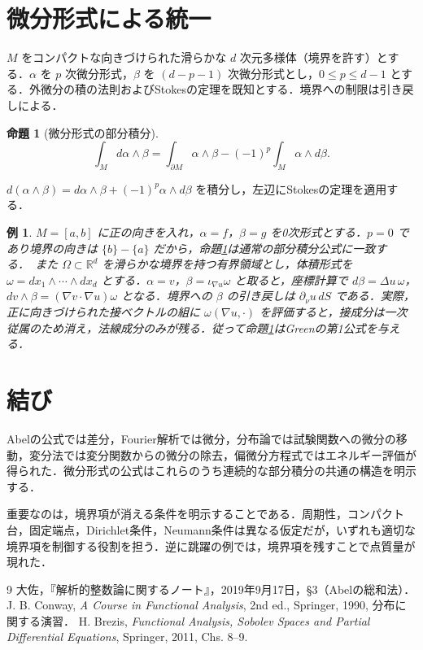 \documentclass[a5paper,10pt,onecolumn]{jsarticle}
\makeatletter
\theoremstyle{mathnotetheorem}
\newtheorem{proposition}[theorem]{命題}
\newtheorem{example}[theorem]{例}
\renewcommand{\proofname}{証明}
\renewenvironment{proof}[1][\proofname]{%
  \par\pushQED{\qed}\normalfont\topsep4\p@\@plus2\p@\relax
  \trivlist\item[\hskip\labelsep\bfseries #1]\ignorespaces
}{\popQED\endtrivlist\@endpefalse}
\newcommand{\R}{\mathbb{R}}
\makeatother
\begin{document}
\section{微分形式による統一}
$M$ をコンパクトな向きづけられた滑らかな $d$ 次元多様体（境界を許す）とする．$\alpha$ を $p$ 次微分形式，$\beta$ を $(d-p-1)$ 次微分形式とし，$0\le p\le d-1$ とする．外微分の積の法則およびStokesの定理を既知とする．境界への制限は引き戻しによる．
\begin{proposition}[微分形式の部分積分]\label{prop:stokes}
\[
 \int_M d\alpha\wedge\beta
 =\int_{\partial M}\alpha\wedge\beta
 -(-1)^p\int_M\alpha\wedge d\beta.
\]
\end{proposition}
\begin{proof}
$d(\alpha\wedge\beta)=d\alpha\wedge\beta+(-1)^p\alpha\wedge d\beta$ を積分し，左辺にStokesの定理を適用する．
\end{proof}
\begin{example}
$M=[a,b]$ に正の向きを入れ，$\alpha=f$，$\beta=g$ を0次形式とする．$p=0$ であり境界の向きは $\{b\}-\{a\}$ だから，命題\ref{prop:stokes}は通常の部分積分公式に一致する．\
また $\Omega\subset\R^d$ を滑らかな境界を持つ有界領域とし，体積形式を $\omega=dx_1\wedge\cdots\wedge dx_d$ とする．$\alpha=v$，$\beta=\iota_{\nabla u}\omega$ と取ると，座標計算で $d\beta=\Delta u\,\omega$，$dv\wedge\beta=(\nabla v\cdot\nabla u)\omega$ となる．境界への $\beta$ の引き戻しは $\partial_\nu u\,dS$ である．実際，正に向きづけられた接ベクトルの組に $\omega(\nabla u,\cdot)$ を評価すると，接成分は一次従属のため消え，法線成分のみが残る．従って命題\ref{prop:stokes}はGreenの第1公式を与える．
\end{example}

\section{結び}
Abelの公式では差分，Fourier解析では微分，分布論では試験関数への微分の移動，変分法では変分関数からの微分の除去，偏微分方程式ではエネルギー評価が得られた．微分形式の公式はこれらのうち連続的な部分積分の共通の構造を明示する．

重要なのは，境界項が消える条件を明示することである．周期性，コンパクト台，固定端点，Dirichlet条件，Neumann条件は異なる仮定だが，いずれも適切な境界項を制御する役割を担う．逆に跳躍の例では，境界項を残すことで点質量が現れた．

\begin{thebibliography}{9}
 大佐，『解析的整数論に関するノート』，2019年9月17日，\S3（Abelの総和法）．
 J. B. Conway, \textit{A Course in Functional Analysis}, 2nd ed., Springer, 1990, 分布に関する演習．
\bibitem{brezis} H. Brezis, \textit{Functional Analysis, Sobolev Spaces and Partial Differential Equations}, Springer, 2011, Chs. 8--9.
\end{thebibliography}
\end{document}

